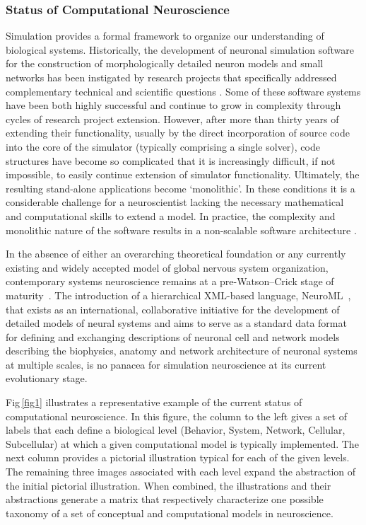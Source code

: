 \documentclass[10pt,letterpaper]{article}
\begin{document}
\subsubsection*{Status of Computational Neuroscience}

Simulation provides a formal framework to organize our understanding of biological systems. Historically, the development of neuronal simulation software for the construction of morphologically detailed neuron models and small networks has been instigated by research projects that specifically addressed complementary technical and scientific questions \cite{Moore:2010vn}.
Some of these software systems have been both highly successful and continue to grow in complexity through cycles of research project extension.
However, after more than thirty years of extending their functionality, usually by the direct incorporation of source code into the core of the simulator (typically comprising a single solver), code structures have become so complicated that it is increasingly difficult, if not impossible, to easily continue extension of simulator functionality.
Ultimately, the resulting stand-alone applications become `monolithic'.
In these conditions it is a considerable challenge for a neuroscientist lacking the necessary mathematical and computational skills to extend a model.
In practice, the complexity and monolithic nature of the software results in a non-scalable software architecture \cite{jaeger02:_comput_neuros_realis_model_exper}.

In the absence of either an overarching theoretical foundation or any currently existing and widely accepted model of global nervous system organization, contemporary systems neuroscience remains at a pre-Watson–Crick stage of maturity~\cite{swanson10}.  The introduction of a hierarchical XML-based language, NeuroML~\cite{gleeson10:neuroml}, that exists as an international, collaborative initiative for the development of detailed models of neural systems and aims to serve as a standard data format for defining and exchanging descriptions of neuronal cell and network models describing the biophysics, anatomy and network architecture of neuronal systems at multiple scales, is no panacea for simulation neuroscience at its current evolutionary stage.

Fig\,\ref{fig1} illustrates a representative example of the current status of computational neuroscience. In this figure, the column to the left gives a set of labels that each define a biological level (Behavior, System, Network, Cellular, Subcellular) at which a given computational model is typically implemented. The next column provides a pictorial illustration typical for each of the given levels. The remaining three images associated with each level expand the abstraction of the initial pictorial illustration. When combined, the illustrations and their abstractions generate a matrix that respectively characterize one possible taxonomy of a set of conceptual and computational models in neuroscience.
\end{document}

